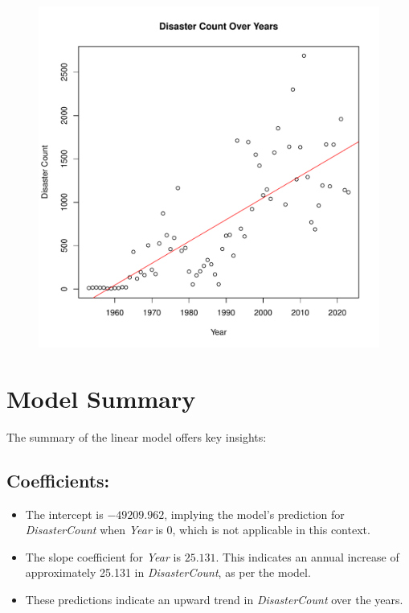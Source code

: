 \documentclass[11pt]{article}\usepackage[]{graphicx}\usepackage[]{xcolor}
\makeatletter
\def\maxwidth{ %
  \ifdim\Gin@nat@width>\linewidth
    \linewidth
  \else
    \Gin@nat@width
  \fi
}
\newenvironment{knitrout}{}{} %
\makeatother
\begin{document}
\begin{figure}[h!]
\centering
  \begin{minipage}{.8\linewidth}
\begin{knitrout}
\color{fgcolor}
\includegraphics[width=\maxwidth]{figure/plot_data_points-1} 
\end{knitrout}
  \label{figure:2}
  \end{minipage}
\end{figure}

\section*{Model Summary}
The summary of the linear model offers key insights:

\subsection*{Coefficients:}
\begin{itemize}
    \item The intercept is $-49209.962$, implying the model's prediction for \textit{DisasterCount} when \textit{Year} is 0, which is not applicable in this context.
    \item The slope coefficient for \textit{Year} is $25.131$. This indicates an annual increase of approximately 25.131 in \textit{DisasterCount}, as per the model.
    \item These predictions indicate an upward trend in \textit{DisasterCount} over the years.
\end{itemize}
\end{document}
